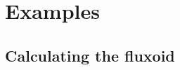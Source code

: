 \documentclass[final,3p,times]{elsarticle}
\newcommand{\inline}[1]{\texttt{#1}\xspace}
\begin{document}

\section{Examples}
\label{section:examples}

\subsection{Calculating the fluxoid}
\label{section:examples:fluxoid}
\end{document}
